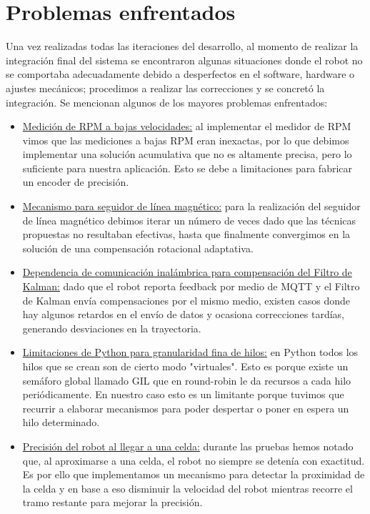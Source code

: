 \section{Problemas enfrentados}

Una vez realizadas todas las iteraciones del desarrollo, al momento de realizar la integración final del sistema se encontraron algunas situaciones donde el robot no se comportaba adecuadamente debido a desperfectos en el software, hardware o ajustes mecánicos; procedimos a realizar las correcciones y se concretó la integración. Se mencionan algunos de los mayores problemas enfrentados:

\begin{itemize}
    \item \underline{Medición de RPM a bajas velocidades:} al implementar el medidor de RPM vimos que las mediciones a bajas RPM eran inexactas, por lo que debimos implementar una solución acumulativa que no es altamente precisa, pero lo suficiente para nuestra aplicación. Esto se debe a limitaciones para fabricar un encoder de precisión.

    \item \underline{Mecanismo para seguidor de línea magnético:} para la realización del seguidor de línea magnético debimos iterar un número de veces dado que las técnicas propuestas no resultaban efectivas, hasta que finalmente convergimos en la solución de una compensación rotacional adaptativa.

    \item \underline{Dependencia de comunicación inalámbrica para compensación del Filtro de Kalman:} dado que el robot reporta feedback por medio de MQTT y el Filtro de Kalman envía compensaciones por el mismo medio, existen casos donde hay algunos retardos en el envío de datos y ocasiona correcciones tardías, generando desviaciones en la trayectoria.

    \item \underline{Limitaciones de Python para granularidad fina de hilos:} en Python todos los hilos que se crean son de cierto modo "virtuales". Esto es porque existe un semáforo global llamado GIL que en round-robin le da recursos a cada hilo periódicamente. En nuestro caso esto es un limitante porque tuvimos que recurrir a elaborar mecanismos para poder despertar o poner en espera un hilo determinado.

    \item \underline{Precisión del robot al llegar a una celda:} durante las pruebas hemos notado que, al aproximarse a una celda, el robot no siempre se detenía con exactitud. Es por ello que implementamos un mecanismo para detectar la proximidad de la celda y en base a eso disminuir la velocidad del robot mientras recorre el tramo restante para mejorar la precisión.
\end{itemize}


